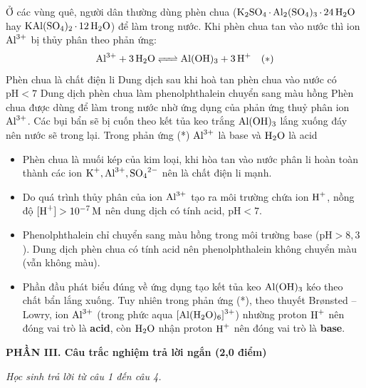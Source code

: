 \documentclass[11pt,a4paper]{article}
\begin{document}
\begin{ex}%
Ở các vùng quê, người dân thường dùng phèn chua ($\ce{K2SO4.Al2(SO4)3.24H2O}$ hay $\ce{KAl(SO4)2.12H2O}$) để làm trong nước. Khi phèn chua tan vào nước thì ion $\ce{Al^{3+}}$ bị thủy phân theo phản ứng:
$$\ce{Al^{3+} + 3H2O <=> Al(OH)3 + 3H+}\quad (*)$$
\choiceTF
{\True Phèn chua là chất điện li}
{\True Dung dịch sau khi hoà tan phèn chua vào nước có $\text{pH} < 7$}
{Dung dịch phèn chua làm phenolphthalein chuyển sang màu hồng}
{Phèn chua được dùng để làm trong nước nhờ ứng dụng của phản ứng thuỷ phân ion $\ce{Al^{3+}}$. Các bụi bẩn sẽ bị cuốn theo kết tủa keo trắng $\ce{Al(OH)3}$ lắng xuống đáy nên nước sẽ trong lại. Trong phản ứng (*) $\ce{Al^{3+}}$ là base và $\ce{H2O}$ là acid}
\begin{loigiai}
\begin{itemize}[leftmargin=1.5cm]
\item[\textbf{a) ĐÚNG:}] Phèn chua là muối kép của kim loại, khi hòa tan vào nước phân li hoàn toàn thành các ion $\ce{K+, Al^{3+}, SO4^{2-}}$ nên là chất điện li mạnh.
\item[\textbf{b) ĐÚNG:}] Do quá trình thủy phân của ion $\ce{Al^{3+}}$ tạo ra môi trường chứa ion $\ce{H+}$, nồng độ $[\ce{H+}] > 10^{-7}\,\text{M}$ nên dung dịch có tính acid, $\text{pH} < 7$.
\item[\textbf{c) SAI:}] Phenolphthalein chỉ chuyển sang màu hồng trong môi trường base ($\text{pH} > 8{,}3$). Dung dịch phèn chua có tính acid nên phenolphthalein không chuyển màu (vẫn không màu).
\item[\textbf{d) SAI:}] Phần đầu phát biểu đúng về ứng dụng tạo kết tủa keo $\ce{Al(OH)3}$ kéo theo chất bẩn lắng xuống. Tuy nhiên trong phản ứng (*), theo thuyết Brønsted -- Lowry, ion $\ce{Al^{3+}}$ (trong phức aqua $\ce{[Al(H2O)6]^{3+}}$) nhường proton $\ce{H+}$ nên đóng vai trò là \textbf{acid}, còn $\ce{H2O}$ nhận proton $\ce{H+}$ nên đóng vai trò là \textbf{base}.
\end{itemize}
\end{loigiai}
\end{ex}


\vspace{6pt}
\noindent
\textbf{\large\color{mainGreen}PHẦN III. Câu trắc nghiệm trả lời ngắn (2,0 điểm)}

\textit{Học sinh trả lời từ câu 1 đến câu 4.}
\vspace{4pt}
\end{document}
